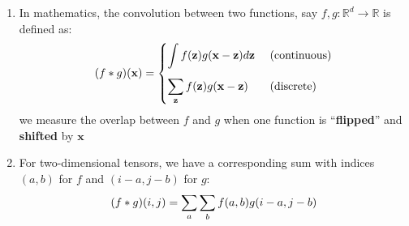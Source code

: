 \begin{enumerate}
    \item In mathematics, the convolution between two functions, say $f, g: \mathbb{R}^d \to \mathbb{R}$ is defined as:
    \[
        \hfill
        (f * g)(\mathbf{x}) = 
        \begin{dcases}
            \dint f(\mathbf{z}) g(\mathbf{x}-\mathbf{z}) d\mathbf{z} & \text{ (continuous)} \\[1ex]
            \dsum_\mathbf{z} f(\mathbf{z}) g(\mathbf{x}-\mathbf{z}) & \text{ (discrete)} \\
        \end{dcases}
        \hfill
    \]
    we measure the overlap between $f$ and $g$ when one function is “\textbf{flipped}” and \textbf{shifted} by $\mathbf{x}$

    \item For two-dimensional tensors, we have a corresponding sum with indices $(a, b)$ for $f$ and $(i - a, j - b)$ for $g$:
    \[
        \hfill
        (f * g)(i, j) = \dsum_a\dsum_b f(a, b) g(i-a, j-b)
        \hfill
    \]
\end{enumerate}



